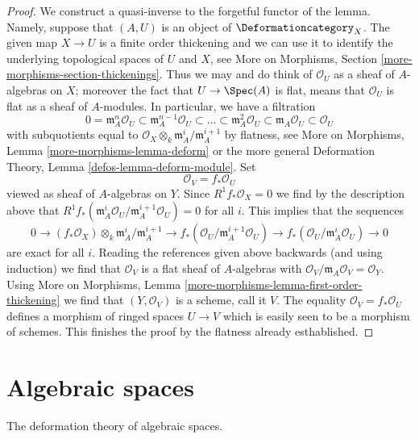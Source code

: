 \begin{proof}
We construct a quasi-inverse to the forgetful functor of the lemma.
Namely, suppose that $(A, U)$ is an object of $\Deformationcategory_X$.
The given map $X \to U$ is a finite order thickening and we can use
it to identify the underlying topological spaces of $U$ and $X$, see
More on Morphisms, Section \ref{more-morphisms-section-thickenings}.
Thus we may and do think of $\mathcal{O}_U$ as a sheaf of
$A$-algebras on $X$; moreover the fact that $U \to \Spec(A)$ is
flat, means that $\mathcal{O}_U$ is flat as a sheaf of $A$-modules.
In particular, we have a filtration
$$
0 = \mathfrak m_A^n\mathcal{O}_U \subset
\mathfrak m_A^{n - 1}\mathcal{O}_U \subset \ldots \subset
\mathfrak m_A^2\mathcal{O}_U \subset
\mathfrak m_A\mathcal{O}_U \subset \mathcal{O}_U
$$
with subquotients equal to
$\mathcal{O}_X \otimes_k \mathfrak m_A^i/\mathfrak m_A^{i + 1}$
by flatness, see More on Morphisms, Lemma \ref{more-morphisms-lemma-deform}
or the more general Deformation Theory, Lemma \ref{defos-lemma-deform-module}.
Set
$$
\mathcal{O}_V = f_*\mathcal{O}_U
$$
viewed as sheaf of $A$-algebras on $Y$. Since
$R^1f_*\mathcal{O}_X = 0$ we find by the description above that
$R^1f_*(\mathfrak m_A^i\mathcal{O}_U/\mathfrak m_A^{i + 1}\mathcal{O}_U) = 0$
for all $i$. This implies that the sequences
$$
0 \to
(f_*\mathcal{O}_X) \otimes_k \mathfrak m_A^i/\mathfrak m_A^{i + 1} \to
f_*(\mathcal{O}_U/\mathfrak m_A^{i + 1}\mathcal{O}_U) \to
f_*(\mathcal{O}_U/\mathfrak m_A^i\mathcal{O}_U) \to 0
$$
are exact for all $i$. Reading the references given above backwards
(and using induction) we find that $\mathcal{O}_V$ is a flat
sheaf of $A$-algebras with
$\mathcal{O}_V/\mathfrak m_A\mathcal{O}_V = \mathcal{O}_Y$.
Using More on Morphisms, Lemma
\ref{more-morphisms-lemma-first-order-thickening}
we find that $(Y, \mathcal{O}_V)$ is a scheme, call it $V$.
The equality $\mathcal{O}_V = f_*\mathcal{O}_U$ defines a
morphism of ringed spaces $U \to V$ which is easily seen to be
a morphism of schemes. This finishes the proof by the
flatness already esthablished.
\end{proof}







\section{Algebraic spaces}
\label{section-algebraic-spaces}

\noindent
The deformation theory of algebraic spaces.

